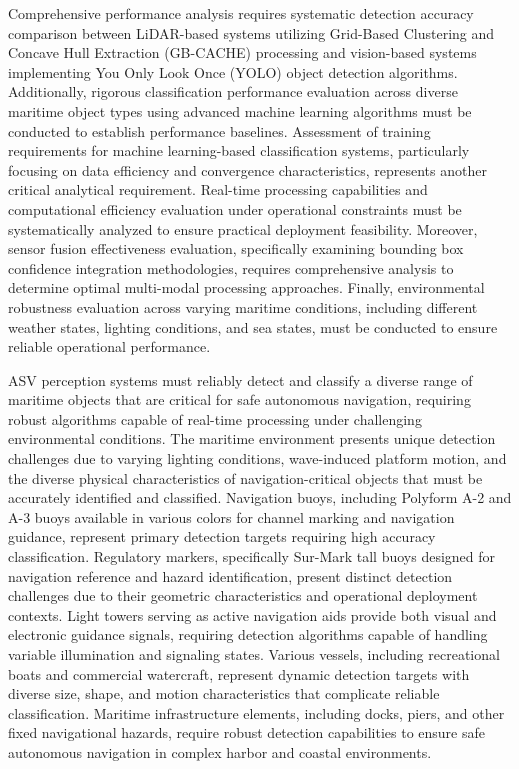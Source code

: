 \documentclass{erauthesis}
\begin{document}
Comprehensive performance analysis requires systematic detection accuracy comparison between LiDAR-based systems utilizing Grid-Based Clustering and Concave Hull Extraction (GB-CACHE) processing and vision-based systems implementing You Only Look Once (YOLO) object detection algorithms. Additionally, rigorous classification performance evaluation across diverse maritime object types using advanced machine learning algorithms must be conducted to establish performance baselines. Assessment of training requirements for machine learning-based classification systems, particularly focusing on data efficiency and convergence characteristics, represents another critical analytical requirement. Real-time processing capabilities and computational efficiency evaluation under operational constraints must be systematically analyzed to ensure practical deployment feasibility. Moreover, sensor fusion effectiveness evaluation, specifically examining bounding box confidence integration methodologies, requires comprehensive analysis to determine optimal multi-modal processing approaches. Finally, environmental robustness evaluation across varying maritime conditions, including different weather states, lighting conditions, and sea states, must be conducted to ensure reliable operational performance.

ASV perception systems must reliably detect and classify a diverse range of maritime objects that are critical for safe autonomous navigation, requiring robust algorithms capable of real-time processing under challenging environmental conditions. The maritime environment presents unique detection challenges due to varying lighting conditions, wave-induced platform motion, and the diverse physical characteristics of navigation-critical objects that must be accurately identified and classified. Navigation buoys, including Polyform A-2 and A-3 buoys available in various colors for channel marking and navigation guidance, represent primary detection targets requiring high accuracy classification. Regulatory markers, specifically Sur-Mark tall buoys designed for navigation reference and hazard identification, present distinct detection challenges due to their geometric characteristics and operational deployment contexts. Light towers serving as active navigation aids provide both visual and electronic guidance signals, requiring detection algorithms capable of handling variable illumination and signaling states. Various vessels, including recreational boats and commercial watercraft, represent dynamic detection targets with diverse size, shape, and motion characteristics that complicate reliable classification. Maritime infrastructure elements, including docks, piers, and other fixed navigational hazards, require robust detection capabilities to ensure safe autonomous navigation in complex harbor and coastal environments.
\end{document}
